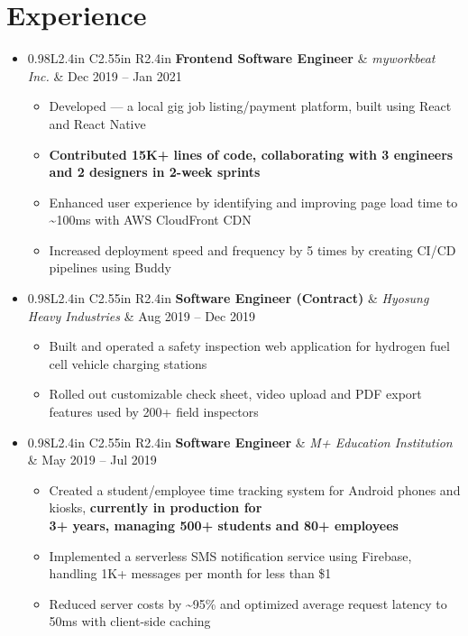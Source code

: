 \documentclass[letterpaper,11pt]{article}
\newcommand{\myuline}[1]{%
  \uline{\phantom{#1}}%
  \llap{\contour{white}{#1}}%
}
\newcommand{\resumeItem}[1]{
  \item\small{
    {#1 \vspace{-2pt}}
  }
}
\newcommand{\resumeEntry}[3]{
  \item
    \begin{tabular*}{0.98\textwidth}{L{2.4in} C{2.55in} R{2.4in}}
      \hspace{-1.5pt}\textbf{#1} & \textit{\small#2} & {#3} \\
    \end{tabular*}\vspace{-5.5pt}
}
\newcommand{\resumeSubHeadingListStart}{\begin{itemize}[leftmargin=0.1in, label={}]}
\newcommand{\resumeSubHeadingListEnd}{\end{itemize}}
\newcommand{\resumeItemListStart}{\begin{itemize}[leftmargin=0.22in]}
\newcommand{\resumeItemListEnd}{\end{itemize}\vspace{-5.7pt}}
\begin{document}
\section{Experience}
  \resumeSubHeadingListStart

    \resumeEntry
      {Frontend Software Engineer}{myworkbeat Inc.}{Dec 2019 -- Jan 2021}
      \resumeItemListStart
        \resumeItem{Developed \href{https://apple.co/3La39ZX}{\myuline{\textbf{sugosugo}}} --- a local gig job listing/payment platform, built using React and React Native}
        \resumeItem{\textbf{Contributed 15K+ lines of code, collaborating with 3 engineers and 2 designers in 2-week sprints}}
        \resumeItem{Enhanced user experience by identifying and improving page load time to \textasciitilde{}100ms with AWS CloudFront CDN}
        \resumeItem{Increased deployment speed and frequency by 5 times by creating CI/CD pipelines using Buddy}
      \resumeItemListEnd

    \resumeEntry
      {Software Engineer (Contract)}{Hyosung Heavy Industries}{Aug 2019 -- Dec 2019}
      \resumeItemListStart
        \resumeItem{Built and operated a safety inspection web application for hydrogen fuel cell vehicle charging stations}
        \resumeItem{Rolled out customizable check sheet, video upload and PDF export features used by 200+ field inspectors}
      \resumeItemListEnd

    \resumeEntry
      {Software Engineer}{M+ Education Institution}{May 2019 -- Jul 2019}
      \resumeItemListStart
        \resumeItem{Created a student/employee time tracking system for Android phones and kiosks, \textbf{currently in production for \\ 3+ years, managing 500+ students and 80+ employees}}
        \resumeItem{Implemented a serverless SMS notification service using Firebase, handling 1K+ messages per month for less than \$1}
        \resumeItem{Reduced server costs by \textasciitilde{}95\% and optimized average request latency to 50ms with client-side caching}
      \resumeItemListEnd


  \resumeSubHeadingListEnd
\end{document}
